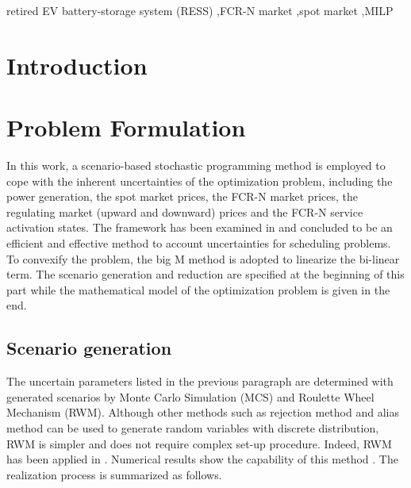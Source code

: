 \documentclass[final,5p,times,twocolumn,authoryear]{elsarticle}
\begin{document}
\begin{frontmatter}
\begin{abstract}
\end{abstract}

\begin{keyword}
 retired EV battery-storage system (RESS) \sep FCR-N market \sep spot market \sep  MILP

\end{keyword}

\end{frontmatter}


\printnomenclature



\section{Introduction}
\label{sec:introduction}


\section{Problem Formulation}
In this work, a scenario-based stochastic programming method is employed to cope with the inherent uncertainties of the optimization problem, including the power generation, the spot market prices, the FCR-N market prices, the regulating market (upward and downward) prices and the FCR-N service activation states. The framework has been examined in \cite{Niknam2012AnOperation, Bornapour2019} and concluded to be an efficient and  effective method to account uncertainties for scheduling problems. To convexify the problem, the big M method is adopted to linearize the bi-linear term. The scenario generation and reduction are specified at the beginning of this part while the mathematical model of the optimization problem is given in the end.
\subsection{Scenario generation}
The uncertain parameters listed in the previous paragraph are determined with generated scenarios by Monte Carlo Simulation (MCS) and Roulette Wheel Mechanism (RWM). Although other methods such as rejection method \cite{lectureNote} and alias method \cite{lectureNote} can be used to generate random variables with discrete distribution, RWM is simpler and does not require complex set-up procedure. Indeed, RWM has been applied in \cite{Niknam2012AnOperation, Bornapour2019, Ahmadi2016}. Numerical results show the capability of this method \cite{Ahmadi2016}. The realization process is summarized as follows.
\end{document}
